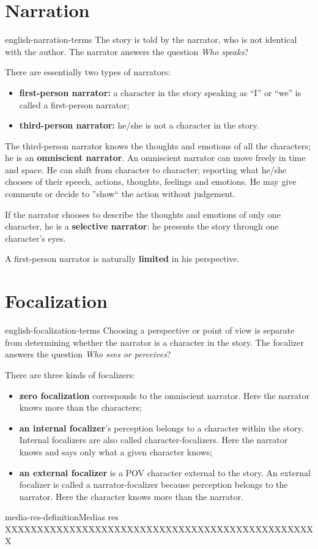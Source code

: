 \documentclass[preview]{standalone}
\begin{document}
\genpage

\section{Narration}

\begin{snippet}{english-narration-terms}
The story is told by the narrator, who is not identical with the author. The narrator answers the
question \textit{Who speaks}?

There are essentially two types of narrators:
\begin{itemize}
    \item \textbf{first-person narrator:}
        a character in the story speaking as “I” or “we” is called a first-person
        narrator;
    \item \textbf{third-person narrator:}
        he/she is not a character in the story.
\end{itemize}

The third-person narrator knows the thoughts and emotions of all the characters; he is an
\textbf{omniscient narrator}. An omniscient narrator can move freely in time and space. He can shift from
character to character; reporting what he/she chooses of their speech, actions, thoughts, feelings
and emotions. He may give comments or decide to ''show`` the action without judgement.

If the narrator chooses to describe the thoughts and emotions of only one character, he is a \textbf{selective
narrator}: he presents the story through one character's eyes.

A first-person narrator is naturally \textbf{limited} in his perspective.
\end{snippet}

\section{Focalization}

\begin{snippet}{english-focalization-terms}
Choosing a perspective or point of view is separate from determining whether the narrator is a
character in the story. The focalizer answers the question \textit{Who sees or perceives}?

There are three kinds of focalizers:
\begin{itemize}
    \item \textbf{zero focalization} corresponds to the omniscient narrator. Here the narrator knows more
    than the characters;
    \item \textbf{an internal focalizer}'s perception belongs to a character within the story. Internal focalizers
    are also called character-focalizers. Here the narrator knows and says only what a given
    character knows;
    \item \textbf{an external focalizer} is a POV character external to the story. An external focalizer is called
    a narrator-focalizer because perception belongs to the narrator. Here the character knows
    more than the narrator.
\end{itemize}
\end{snippet}

\begin{snippetdefinition}{media-res-definition}{Medias res}
    XXXXXXXXXXXXXXXXXXXXXXXXXXXXXXXXXXXXXXXXXXXXXXXXX
\end{snippetdefinition}
\end{document}
